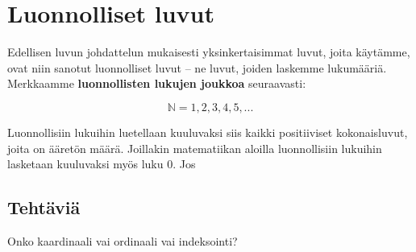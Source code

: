 \chapter{Luonnolliset luvut}

Edellisen luvun johdattelun mukaisesti yksinkertaisimmat luvut, joita käytämme, ovat niin sanotut luonnolliset luvut – ne luvut, joiden laskemme lukumääriä. Merkkaamme \textbf{luonnollisten lukujen joukkoa} seuraavasti:

\[\mathbb{N}={1, 2, 3, 4, 5, ...}\]

Luonnollisiin lukuihin luetellaan kuuluvaksi siis kaikki positiiviset kokonaisluvut, joita on ääretön määrä. Joillakin matematiikan aloilla luonnollisiin lukuihin lasketaan kuuluvaksi myös luku $0$. Jos 





\section{Tehtäviä}

\begin{tehtava}

Onko kaardinaali vai ordinaali vai indeksointi?

\end{tehtava}